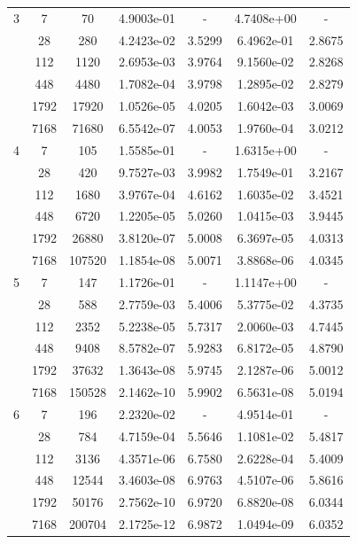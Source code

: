 \begin{longtable}{| c | c c | c c | c c |}
	\hline

	3	& 7 & 70 & 4.9003e-01 & - & 4.7408e+00 & - \\
		& 28 & 280 & 4.2423e-02 & 3.5299 & 6.4962e-01 & 2.8675 \\
		& 112 & 1120 & 2.6953e-03 & 3.9764 & 9.1560e-02 & 2.8268 \\
		& 448 & 4480 & 1.7082e-04 & 3.9798 & 1.2895e-02 & 2.8279 \\
		& 1792 & 17920 & 1.0526e-05 & 4.0205 & 1.6042e-03 & 3.0069 \\
		& 7168 & 71680 & 6.5542e-07 & 4.0053 & 1.9760e-04 & 3.0212 \\

	\hline

	4	& 7 & 105 & 1.5585e-01 & - & 1.6315e+00 & - \\
		& 28 & 420 & 9.7527e-03 & 3.9982 & 1.7549e-01 & 3.2167 \\
		& 112 & 1680 & 3.9767e-04 & 4.6162 & 1.6035e-02 & 3.4521 \\
		& 448 & 6720 & 1.2205e-05 & 5.0260 & 1.0415e-03 & 3.9445 \\
		& 1792 & 26880 & 3.8120e-07 & 5.0008 & 6.3697e-05 & 4.0313 \\
		& 7168 & 107520 & 1.1854e-08 & 5.0071 & 3.8868e-06 & 4.0345 \\

	\hline

	5	& 7 & 147 & 1.1726e-01 & - & 1.1147e+00 & - \\
		& 28 & 588 & 2.7759e-03 & 5.4006 & 5.3775e-02 & 4.3735 \\
		& 112 & 2352 & 5.2238e-05 & 5.7317 & 2.0060e-03 & 4.7445 \\
		& 448 & 9408 & 8.5782e-07 & 5.9283 & 6.8172e-05 & 4.8790 \\
		& 1792 & 37632 & 1.3643e-08 & 5.9745 & 2.1287e-06 & 5.0012 \\
		& 7168 & 150528 & 2.1462e-10 & 5.9902 & 6.5631e-08 & 5.0194 \\
	
	\hline

    6   & 7 & 196 & 2.2320e-02 & - & 4.9514e-01 & - \\
        & 28 & 784 & 4.7159e-04 & 5.5646 & 1.1081e-02 & 5.4817 \\
        & 112 & 3136 & 4.3571e-06 & 6.7580 & 2.6228e-04 & 5.4009 \\
        & 448 & 12544 & 3.4603e-08 & 6.9763 & 4.5107e-06 & 5.8616 \\
        & 1792 & 50176 & 2.7562e-10 & 6.9720 & 6.8820e-08 & 6.0344 \\
        & 7168 & 200704 & 2.1725e-12 & 6.9872 & 1.0494e-09 & 6.0352 \\


\end{longtable}
